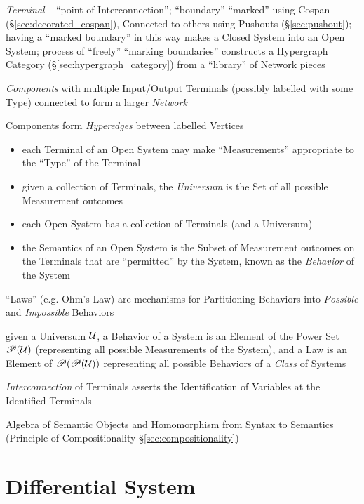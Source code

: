 \emph{Terminal} -- ``point of Interconnection''; ``boundary''
``marked'' using Cospan (\S\ref{sec:decorated_cospan}), Connected to
others using Pushouts (\S\ref{sec:pushout}); having a ``marked
boundary'' in this way makes a Closed System into an Open System;
process of ``freely''  ``marking boundaries'' constructs a Hypergraph
Category (\S\ref{sec:hypergraph_category}) from a ``library'' of
Network pieces

\emph{Components} with multiple Input/Output Terminals (possibly
labelled with some Type) connected to form a larger \emph{Network}

Components form \emph{Hyperedges} between labelled Vertices

\begin{itemize}
  \item each Terminal of an Open System may make ``Measurements''
    appropriate to the ``Type'' of the Terminal
  \item given a collection of Terminals, the \emph{Universum} is the
    Set of all possible Measurement outcomes
  \item each Open System has a collection of Terminals (and a Universum)
  \item the Semantics of an Open System is the Subset of Measurement
    outcomes on the Terminals that are ``permitted'' by the System,
    known as the \emph{Behavior} of the System
\end{itemize}


``Laws'' (e.g. Ohm's Law) are mechanisms for Partitioning Behaviors
into \emph{Possible} and \emph{Impossible} Behaviors

given a Universum $\mathcal{U}$, a Behavior of a System is an Element
of the Power Set $\mathscr{P}(\mathcal{U})$ (representing all possible
Measurements of the System), and a Law is an Element of
$\mathscr{P}(\mathscr{P}(\mathcal{U}))$ representing all possible Behaviors of a
\emph{Class} of Systems

\emph{Interconnection} of Terminals asserts the Identification of
Variables at the Identified Terminals

Algebra of Semantic Objects and Homomorphism from Syntax to Semantics
(Principle of Compositionality \S\ref{sec:compositionality})



\section{Differential System}\label{sec:differential_system}

